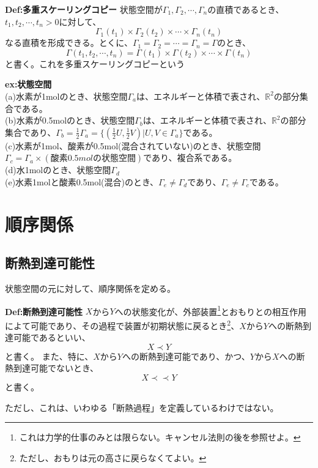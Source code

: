 \documentclass[a4paper,11pt]{jsarticle}
\numberwithin{equation}{section}
\begin{document}
\begin{itembox}[l]{\textbf{Def:多重スケーリングコピー}}
    状態空間が$\Gamma_1,\Gamma_2,\cdots,\Gamma_n$の直積であるとき、$t_1,t_2,\cdots,t_n>0$に対して、
    \begin{equation}
        \Gamma_1(t_1) \times \Gamma_2(t_2) \times \cdots \times \Gamma_n(t_n)
    \end{equation}
    なる直積を形成できる。とくに、$\Gamma_1=\Gamma_2=\cdots=\Gamma_n=\Gamma$のとき、
    \begin{equation}
        \Gamma(t_1,t_2,\cdots,t_n)=\Gamma(t_1) \times \Gamma(t_2) \times \cdots \times \Gamma(t_n)
    \end{equation}
    と書く。これを多重スケーリングコピーという
\end{itembox}

\textbf{ex:状態空間}\\
(a)水素が1molのとき、状態空間$\Gamma_a$は、エネルギーと体積で表され、$\mathbb{{R}}^2$の部分集合である。\\
(b)水素が0.5molのとき、状態空間$\Gamma_b$は、エネルギーと体積で表され、$\mathbb{{R}}^2$の部分集合であり、$\Gamma_b=\frac{1}{2}\Gamma_a=\{(\frac{1}{2}U,\frac{1}{2}V)|U,V \in \Gamma_a\}$である。\\
(c)水素が1mol、酸素が0.5mol(混合されていない)のとき、状態空間$\Gamma_c=\Gamma_a \times (酸素0.5molの状態空間)$であり、複合系である。\\
(d)水1molのとき、状態空間$\Gamma_d$\\
(e)水素1molと酸素0.5mol(混合)のとき、$\Gamma_e\neq \Gamma_d$であり、$\Gamma_e\neq \Gamma_c$である。\\

\newpage
\section{順序関係}
\subsection{断熱到達可能性}
状態空間の元に対して、順序関係を定める。
\begin{itembox}[l]{\textbf{Def:断熱到達可能性}}
    $X$から$Y$への状態変化が、外部装置\footnote{これは力学的仕事のみとは限らない。キャンセル法則の後を参照せよ。}とおもりとの相互作用によて可能であり、その過程で装置が初期状態に戻るとき\footnote{ただし、おもりは元の高さに戻らなくてよい。}、$X$から$Y$への断熱到達可能であるといい、
    \begin{equation}
        X \prec Y
    \end{equation}
    と書く。
    また、特に、$X$から$Y$への断熱到達可能であり、かつ、$Y$から$X$への断熱到達可能でないとき、
    \begin{equation}
        X \prec \prec Y
    \end{equation}
    と書く。
\end{itembox}
ただし、これは、いわゆる「断熱過程」を定義しているわけではない。\\
\end{document}
